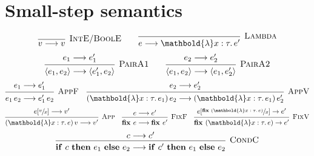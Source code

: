 \documentclass[a4paper]{scrreprt}
\begin{document}
\chapter{Small-step semantics}
\[
  \begin{prooftree}[center=false]
    \infer0[\textsc{IntE}/\textsc{BoolE}]{v \longrightarrow v}
  \end{prooftree}
  \qquad
  \begin{prooftree}[center=false]
    \infer0[\textsc{Lambda}]{e \longrightarrow \mathbold{\lambda} x : \tau \ldotp e'}
  \end{prooftree}
\]
\[
  \begin{prooftree}
    \hypo{e_1 \longrightarrow e'_1}
    \infer1[\textsc{PairA1}]{\langle e_1,e_2 \rangle \longrightarrow \langle e'_1,e_2 \rangle}
  \end{prooftree}
  \qquad
  \begin{prooftree}
    \hypo{e_2 \longrightarrow e'_2}
    \infer1[\textsc{PairA2}]{\langle e_1,e_2 \rangle \longrightarrow \langle e_1,e'_2 \rangle}
  \end{prooftree}
\]
\[
  \begin{prooftree}
    \hypo{e_1 \longrightarrow e'_1}
    \infer1[\textsc{AppF}]{e_1\,e_2 \longrightarrow e'_1\,e_2}
  \end{prooftree}
  \quad
  \begin{prooftree}
    \hypo{e_2 \longrightarrow e'_2}
    \infer1[\textsc{AppV}]{(\mathbold{\lambda}x : \tau \ldotp e_1)\,e_2 \longrightarrow (\mathbold{\lambda}x : \tau \ldotp e_1)\,e'_2}
  \end{prooftree}
\]
\[
  \begin{prooftree}
    \hypo{e[\sfrac{v}{x}] \longrightarrow v'}
    \infer1[\textsc{App}]{(\mathbold{\lambda}x : \tau \ldotp e)\,v \longrightarrow v'}
  \end{prooftree}
  \quad
  \begin{prooftree}
    \hypo{e \longrightarrow e'}
    \infer1[\textsc{FixF}]{\text{\textbf{fix }} e \longrightarrow \text{\textbf{fix }} e'}
  \end{prooftree}
  \quad
  \begin{prooftree}
    \hypo{e[\sfrac{\text{\textbf{fix }} (\mathbold{\lambda}x : \tau \ldotp e)}{x}] \rightarrow e'}
    \infer1[\textsc{FixV}]{\text{\textbf{fix }} (\mathbold{\lambda}x : \tau \ldotp e) \rightarrow e'}
  \end{prooftree}
\]
\[
  \begin{prooftree}
    \hypo{c \longrightarrow c'}
    \infer1[\textsc{CondC}]{\text{\textbf{if} } c \text{ \textbf{then} } e_1 \text{ \textbf{else} } e_2 \longrightarrow \text{\textbf{if} } c' \text{ \textbf{then} } e_1 \text{ \textbf{else} } e_2}
  \end{prooftree}
\]
\end{document}
